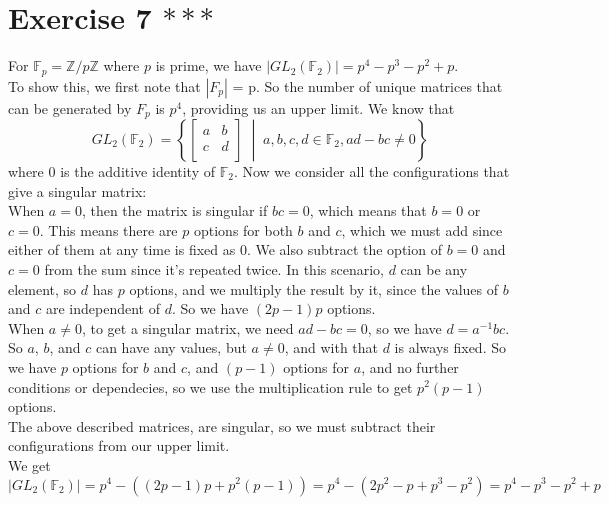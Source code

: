 \documentclass[12pt]{article}
\newcommand{\Z}{\mathbb{Z}}
\newcommand{\F}{\mathbb{F}}
\begin{document}
    \section*{Exercise 7 $***$}
    For $\F_p = \Z/p\Z$ where $p$ is prime,
    we have $|GL_2(\F_2)| = p^4 - p^3 - p^2 + p$. \\
    To show this, we first note that $|F_p|$ = p. 
    So the number of unique matrices that can be generated by $F_p$
    is $p^4$, providing us an upper limit.
    We know that
    \[ GL_2(\F_2) = \left\{
        \begin{bmatrix}
            a & b \\
            c & d \\
        \end{bmatrix} 
        \; \middle\vert \;
        a, b, c, d \in \F_2,
        ad - bc \neq 0  
    \right\} \] 
    where 0 is the additive identity of $\F_2$.
    Now we consider all the configurations that give a singular matrix: \\
    When $a = 0$,
    then the matrix is singular if $bc = 0$,
    which means that $b = 0$ or $c = 0$.
    This means there are $p$ options for both $b$ and $c$,
    which we must add since either of them at any time is fixed as 0.
    We also subtract the option of $b = 0$ and $c = 0$ from the sum
    since it's repeated twice.
    In this scenario, $d$ can be any element,
    so $d$ has $p$ options,
    and we multiply the result by it,
    since the values of $b$ and $c$ are independent of $d$.
    So we have $(2p - 1)p$ options. \\
    When $a \neq 0$,
    to get a singular matrix, we need $ad - bc = 0$,
    so we have $d = a^{-1}bc$.
    So $a$, $b$, and $c$ can have any values,
    but $a \neq 0$,
    and with that $d$ is always fixed.
    So we have $p$ options for $b$ and $c$,
    and $(p-1)$ options for $a$,
    and no further conditions or dependecies,
    so we use the multiplication rule to get $p^2(p-1)$ options. \\
    The above described matrices, are singular,
    so we must subtract their configurations from our upper limit. \\
    We get $|GL_2(\F_2)| = p^4 - ((2p - 1)p + p^2(p-1))
    = p^4 - (2p^2 - p + p^3 - p^2)
    = p^4 - p^3 - p^2 + p$
\end{document}
